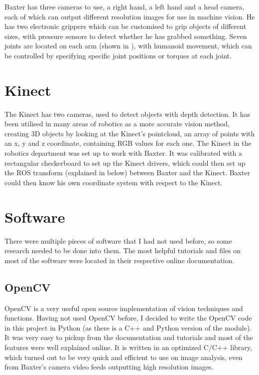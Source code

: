 Baxter has three cameras to use, a right hand, a left hand and a head camera, each of which can output different resolution images for use in machine vision. He has two electronic grippers which can be customised to grip objects of different sizes, with pressure sensors to detect whether he has grabbed something. Seven joints are located on each arm (shown in \textbf{}), with humanoid movement, which can be controlled by specifying specific joint positions or torques at each joint.
\section{Kinect}
The Kinect has two cameras, used to detect objects with depth detection. It has been utilised in many areas of robotics as a more accurate vision method, creating 3D objects by looking at the Kinect's pointcloud, an array of points with an x, y and z coordinate, containing RGB values for each one. The Kinect in the robotics department was set up to work with Baxter. It was calibrated with a rectangular checkerboard to set up the Kinect drivers, which could then set up the ROS transform (explained in \textbf{} below) between Baxter and the Kinect. Baxter could then know his own coordinate system with respect to the Kinect.
\section{Software}
There were multiple pieces of software that I had not used before, so some research needed to be done into them. The most helpful tutorials and files on most of the software were located in their respective online documentation.
\subsection{OpenCV}
OpenCV is a very useful open source implementation of vision techniques and functions. Having not used OpenCV before, I decided to write the OpenCV code in this project in Python (as there is a C++ and Python version of the module). It was very easy to pickup from the documentation and tutorials and most of the features were well explained online. It is written in an optimized C/C++ library, which turned out to be very quick and efficient to use on image analysis, even from Baxter's camera video feeds outputting high resolution images.
